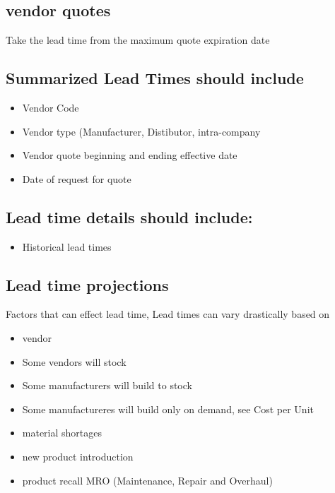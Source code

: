 \documentclass[letterpaper,10pt,english]{sphinxmanual}
\begin{document}
\subsection{vendor quotes}
\label{Portal/750-Requisitions:vendor-quotes}
Take the lead time from the maximum quote expiration date


\subsection{Summarized Lead Times should include}
\label{Portal/750-Requisitions:summarized-lead-times-should-include}\begin{itemize}
\item {} 
Vendor Code

\item {} 
Vendor type (Manufacturer, Distibutor, intra-company

\item {} 
Vendor quote beginning and ending effective date

\item {} 
Date of request for quote

\end{itemize}


\subsection{Lead time details should include:}
\label{Portal/750-Requisitions:lead-time-details-should-include}\begin{itemize}
\item {} 
Historical lead times

\end{itemize}


\subsection{Lead time projections}
\label{Portal/750-Requisitions:lead-time-projections}
Factors that can effect lead time, Lead times can vary drastically based
on
\begin{itemize}
\item {} 
vendor

\item {} 
Some vendors will stock

\item {} 
Some manufacturers will build to stock

\item {} 
Some manufactureres will build only on demand, see Cost per Unit

\item {} 
material shortages

\item {} 
new product introduction

\item {} 
product recall MRO (Maintenance, Repair and Overhaul)

\end{itemize}
\end{document}
